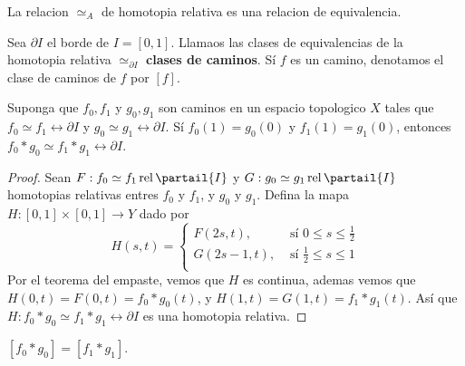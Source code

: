 \begin{lemma}\label{11.32}
    La relacion $\simeq_A$ de homotopia relativa es una relacion de
    equivalencia.
\end{lemma}

\begin{definition}
    Sea $\partial{I}$ el borde de $I=[0,1]$. Llamaos las clases de equivalencias
    de la homotopia relativa $\simeq_{\partial{I}}$ \textbf{clases de caminos}.
    S\'i $f$ es un camino, denotamos el clase de caminos de  $f$ por  $[f]$.
\end{definition}

\begin{theorem}\label{11.32}
    Suponga que $f_0,f_1$ y $g_0,g_1$ son caminos en un espacio topologico $X$
    tales que  $f_0 \simeq f_1 \rel{\partial{I}}$ y $g_0 \simeq g_1
    \rel{\partial{I}}$. S\'i $f_0(1)=g_0(0)$ y $f_1(1)=g_1(0)$, entonces
    $f_0 \ast g_0 \simeq f_1 \ast g_1 \rel{\partial{I}}$.
\end{theorem}
\begin{proof}
    Sean $F:f_0 \simeq f_1 \rel{\partail{I}}$ y $G:g_0 \simeq g_1
    \rel{\partail{I}}$ homotopias relativas entres  $f_0$ y $f_1$, y $g_0$ y
    $g_1$. Defina la mapa $H:[0,1] \times [0,1] \xrightarrow{} Y$ dado por
    \begin{equation*}
     H(s,t)=\begin{cases}
                 F(2s,t), & \text{ s\'i } 0 \leq s \leq \frac{1}{2} \\
                 G(2s-1,t), & \text{ s\'i } \frac{1}{2} \leq s \leq 1   \\
            \end{cases}
    \end{equation*}
    Por el teorema del empaste, vemos que $H$ es continua, ademas vemos que
    $H(0,t)=F(0,t)=f_0 \ast g_0(t)$, y $H(1,t)=G(1,t)=f_1 \ast g_1(t)$. As\'i
    que $H:f_0 \ast g_0 \simeq f_1 \ast g_1 \rel{\partial{I}}$ es una homotopia
    relativa.
\end{proof}
\begin{corollary}
    $[f_0 \ast g_0]=[f_1 \ast g_1]$.
\end{corollary}
